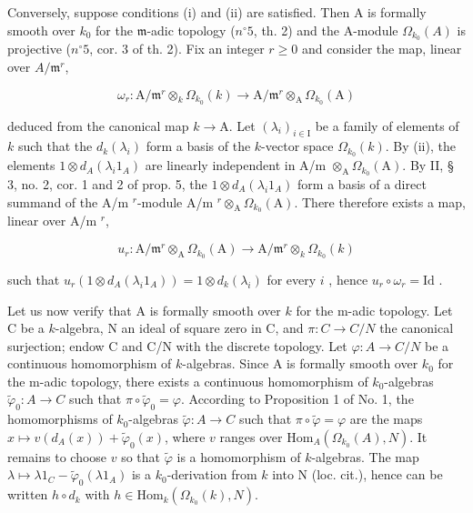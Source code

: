 Conversely, suppose conditions (i) and (ii) are satisfied. Then A is formally smooth over \(k_{0}\) for the \(\mathfrak{m}\)-adic topology (\(n^{\circ}5\), th. 2) and the A-module \(\Omega_{k_{0}}(A)\) is projective (\(n^{\circ}5\), cor. 3 of th. 2). Fix an integer \(r \geqslant 0\) and consider the map, linear over \(A/\mathfrak{m}^{r}\),

\[
\omega_ {r}: \mathrm{A} / \mathfrak {m} ^ {r} \otimes_ {k} \Omega_ {k _ {0}} (k) \longrightarrow \mathrm{A} / \mathfrak {m} ^ {r} \otimes_ {\mathrm{A}} \Omega_ {k _ {0}} (\mathrm{A})
\]

deduced from the canonical map \(k\to\mathrm{A}\). Let \((\lambda_{i})_{i\in\mathrm{I}}\) be a family of elements of \(k\) such that the \(d_{k}(\lambda_{i})\) form a basis of the \(k\)-vector space \(\Omega_{k_{0}}(k)\). By (ii), the elements \(1 \otimes d_{A}(\lambda_{i}1_{A})\) are linearly independent in A/m \(\otimes_{\mathrm{A}} \Omega_{k_0}(\mathrm{A})\). By II, § 3, no. 2, cor. 1 and 2 of prop. 5, the \(1 \otimes d_{A}(\lambda_{i}1_{A})\) form a basis of a direct summand of the A/m \(^{r}\)-module A/m \(^{r} \otimes_{\mathrm{A}} \Omega_{k_0}(\mathrm{A})\). There therefore exists a map, linear over A/m \(^{r}\),

\[
u _ {r}: \mathrm{A} / \mathfrak {m} ^ {r} \otimes_ {\mathrm{A}} \Omega_ {k _ {0}} (\mathrm{A}) \longrightarrow \mathrm{A} / \mathfrak {m} ^ {r} \otimes_ {k} \Omega_ {k _ {0}} (k)
\]

such that \(u_r(1 \otimes d_A(\lambda_i 1_A)) = 1 \otimes d_k(\lambda_i)\) for every \(i\) , hence \(u_r \circ \omega_r = \mathrm{Id}\) .

Let us now verify that A is formally smooth over \(k\) for the m-adic topology. Let C be a \(k\)-algebra, N an ideal of square zero in C, and \(\pi: C \to C/N\) the canonical surjection; endow C and C/N with the discrete topology. Let \(\varphi: A \to C/N\) be a continuous homomorphism of \(k\)-algebras. Since A is formally smooth over \(k_0\) for the m-adic topology, there exists a continuous homomorphism of \(k_0\)-algebras \(\tilde{\varphi}_0: A \to C\) such that \(\pi \circ \tilde{\varphi}_0 = \varphi\). According to Proposition 1 of No. 1, the homomorphisms of \(k_0\)-algebras \(\tilde{\varphi}: A \to C\) such that \(\pi \circ \tilde{\varphi} = \varphi\) are the maps \(x \mapsto v(d_A(x)) + \tilde{\varphi}_0(x)\), where \(v\) ranges over \(\mathrm{Hom}_{A}(\Omega_{k_0}(A), N)\). It remains to choose \(v\) so that \(\tilde{\varphi}\) is a homomorphism of \(k\)-algebras. The map \(\lambda \mapsto \lambda 1_C - \tilde{\varphi}_0(\lambda 1_A)\) is a \(k_0\)-derivation from \(k\) into N (loc. cit.), hence can be written \(h \circ d_k\) with \(h \in \mathrm{Hom}_k(\Omega_{k_0}(k), N)\).


